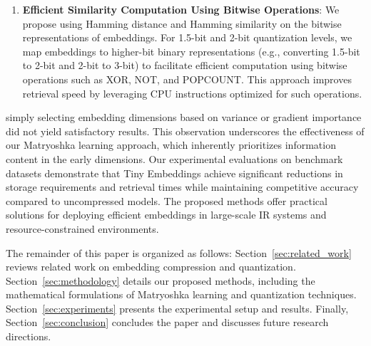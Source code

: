 \documentclass[acmtog, authorversion]{acmart}
\begin{document}
\begin{enumerate}
    \item \textbf{Efficient Similarity Computation Using Bitwise Operations}: We propose using Hamming distance and Hamming similarity on the bitwise representations of embeddings. For 1.5-bit and 2-bit quantization levels, we map embeddings to higher-bit binary representations (e.g., converting 1.5-bit to 2-bit and 2-bit to 3-bit) to facilitate efficient computation using bitwise operations such as XOR, NOT, and POPCOUNT. This approach improves retrieval speed by leveraging CPU instructions optimized for such operations.  
  
  
\end{enumerate}  
simply selecting embedding dimensions based on variance or gradient importance did not yield satisfactory results. This observation underscores the effectiveness of our Matryoshka learning approach, which inherently prioritizes information content in the early dimensions.  
Our experimental evaluations on benchmark datasets demonstrate that Tiny Embeddings achieve significant reductions in storage requirements and retrieval times while maintaining competitive accuracy compared to uncompressed models. The proposed methods offer practical solutions for deploying efficient embeddings in large-scale IR systems and resource-constrained environments.  
  
The remainder of this paper is organized as follows: Section~\ref{sec:related_work} reviews related work on embedding compression and quantization. Section~\ref{sec:methodology} details our proposed methods, including the mathematical formulations of Matryoshka learning and quantization techniques. Section~\ref{sec:experiments} presents the experimental setup and results. Finally, Section~\ref{sec:conclusion} concludes the paper and discusses future research directions.  
  

  
  



\end{document}
